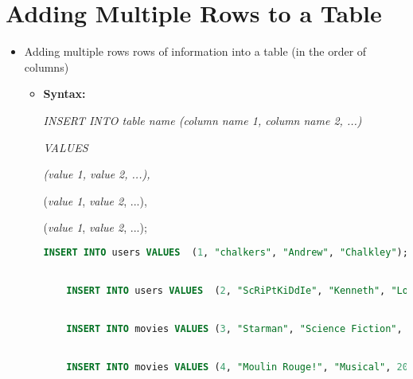 \documentclass[12pt]{article}
\begin{document}
\section{Adding Multiple Rows to a Table}

\bigskip

\begin{itemize}
    \item Adding multiple rows rows of information into a table (in the order of columns)
    \begin{itemize}
        \item \textbf{Syntax:}

        \bigskip
    \textit{INSERT INTO \textit{table name} (\textit{column name 1}, \textit{column name 2}, ...)}

    \textit{VALUES}


    \t\t\textit{(\textit{value 1}, \textit{value 2}, ...),}


            (\textit{value 1}, \textit{value 2}, ...),


            (\textit{value 1}, \textit{value 2}, ...);


    \begin{lstlisting}[language=SQL]
    INSERT INTO users VALUES  (1, "chalkers", "Andrew", "Chalkley");


    INSERT INTO users VALUES  (2, "ScRiPtKiDdIe", "Kenneth", "Love");


    INSERT INTO movies VALUES (3, "Starman", "Science Fiction", 1984);


    INSERT INTO movies VALUES (4, "Moulin Rouge!", "Musical", 2001);
    \end{lstlisting}

    \end{itemize}
\end{itemize}
\end{document}
